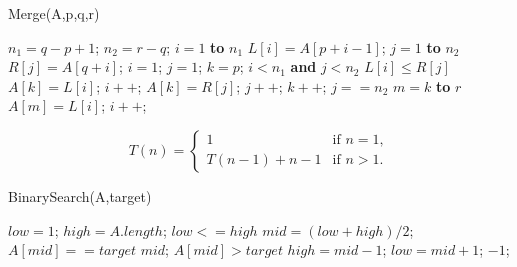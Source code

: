 \documentclass[review, authoryear, 3p, 12pt]{elsarticle}
\begin{document}
	\begin{algorithm}[htbp]
		\caption{Merge(A,p,q,r)}
		\label{alg:tsh}
		\begin{codebox}
			\li 	$n_1=q-p+1$;
			\li 	$n_2=r-q$;
			\li 	{}
			\li 	\For $i=1$ \textbf{to} $n_1$
					\Do
			\li 		$L[i] = A[p+i-1]$;
						\End
			\li 	\For $j=1$ \textbf{to} $n_2$
					\Do
			\li 		$R[j] = A[q+i]$;
					\End
			\li 	$i=1$;
			\li 	$j=1$;
			\li 	$k=p$;
			\li 	\While $i < n_1$ \textbf{and} $j < n_2$
					\Do
			\li 		\If $L[i] \leq R[j]$
						\Do
			\li 			$A[k]=L[i]$;
			\li 			$i++$;
			\li			\Else
			\li 			$A[k]=R[j]$;
			\li 			$j++$;
						\End
			\li			$k++$;
					\End
			\li 	\If $j==n_2$
					\Do
			\li 		\For $m=k$ \textbf{to} $r$
							\Do
			\li 				$A[m] = L[i]$;
			\li 				$i++$;
						\End
					\End
		\end{codebox}
	\end{algorithm}
	
	\begin{equation*}
		T(n)=
		\begin{cases}
			1 &\text{if $n=1$},\\
			T(n-1)+n-1 &\text{if $n>1$}.
		\end{cases}
	\end{equation*}
	
	\begin{algorithm}[htbp]
		\caption{BinarySearch(A,target)}
		\begin{codebox}
			\li 	$low=1$;
			\li 	$high=A.length$;
			\li 	\While $low <= high$
					\Do
			\li 		$mid=(low+high)/2$;
			\li 		\If $A[mid] == target$
						\Do
			\li 			\Return $mid$;
						\End
			\li 		\If $A[mid] > target$
						\Do
			\li 			$high = mid-1$;
			\li 		\Else
			\li 			$low=mid+1$;
						\End
					\End
			\li 	\Return $-1$;
		\end{codebox}
	\end{algorithm}
\end{document}
